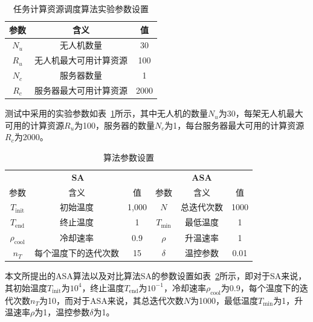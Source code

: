 \begin{table}[!htbp]
    \caption{任务计算资源调度算法实验参数设置}
    \label{tab:任务计算资源调度算法实验参数设置}
    \centering
    \begin{tabular}{c c c}
        \toprule
        \textbf{参数} & \textbf{含义} & \textbf{值}\\
        \midrule
        \( N_u \) & 无人机数量 & 30 \\
        \( R_u \) & 无人机最大可用计算资源 & 100 \\
        \( N_c \) & 服务器数量 & 1 \\
        \( R_c \) & 服务器最大可用计算资源 & 2000 \\
        \bottomrule
    \end{tabular}
\end{table}


测试中采用的实验参数如表~\ref{tab:任务计算资源调度算法实验参数设置}所示，其中无人机的数量\( N_u \)为30，每架无人机最大可用的计算资源\(R_u\)为100，服务器的数量\( N_c \)为1，每台服务器最大可用的计算资源\( R_c \)为2000。

\begin{table}[!htbp]
    \caption{算法参数设置}
    \label{tab:算法参数设置}
    \centering
    \begin{tabular}{c c c c c c}
        \toprule
        \multicolumn{3}{c}{\textbf{SA}} & \multicolumn{3}{c}{\textbf{ASA}} \\
        \cmidrule(lr){1-3} \cmidrule(lr){4-6} 
        参数 & 含义 & 值 & 参数 & 含义 & 值\\
        \midrule
        \( T_{\textrm{init}} \) & 初始温度 & 1,000 & \( N \) & 总迭代次数 & 1000 \\
        \( T_{\textrm{end}} \) & 终止温度 & 1 & \( T_{\textrm{min}} \) & 最低温度 & 1 \\
        \( \rho_{\textrm{cool}} \) & 冷却速率 & 0.9 & \( \rho \) & 升温速率 & 1 \\
        \( n_T \) & 每个温度下的迭代次数 & 15 & \( \delta \) & 温控参数 & 0.01 \\
        \bottomrule
    \end{tabular}
\end{table}

本文所提出的ASA算法以及对比算法SA的参数设置如表~\ref{tab:算法参数设置}所示，即对于SA来说，其初始温度\( T_{\textrm{init}} \)为\(10^4\)，终止温度\( T_{\textrm{end}} \)为\(10^{-1}\)，冷却速率\( \rho_{\textrm{cool}} \)为0.9，每个温度下的迭代次数\(n_T\)为10，而对于ASA来说，其总迭代次数\(N\)为1000，最低温度\(T_{\textrm{min}}\)为1，升温速率\( \rho \)为1，温控参数\( \delta \)为1。

